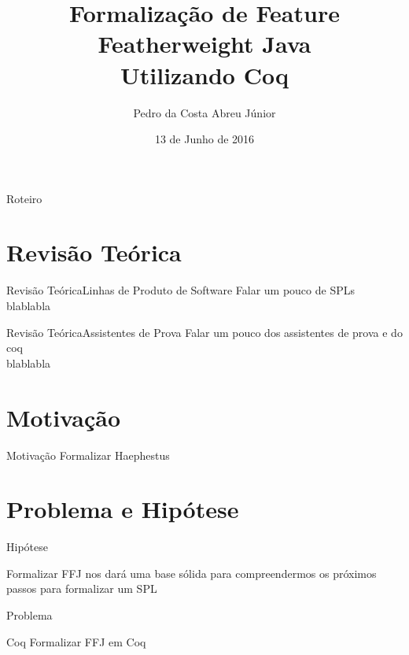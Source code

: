 \documentclass{beamer}
\title[Formalização de FFJ em Coq]{Formalização de Feature Featherweight Java \\ Utilizando Coq}
\author{Pedro da Costa Abreu Júnior}
\institute[UnB]
{
	Departamento de Ciência da Computação\\
	Universidade de Brasília 
}
\date{13 de Junho de 2016}
\begin{document}
	
	\begin{frame}
		\titlepage
	\end{frame}
	
	\begin{frame}{Roteiro}
		\tableofcontents
	\end{frame}
	
	\section{Revisão Teórica}
	\begin{frame}{Revisão Teórica}{Linhas de Produto de Software}
		\centering
		Falar um pouco de SPLs \\
		blablabla
	\end{frame}
	
	\begin{frame}{Revisão Teórica}{Assistentes de Prova}
		\centering
		Falar um pouco dos assistentes de prova e do coq \\
		blablabla
	\end{frame}

	\section{Motivação}
	\begin{frame}{Motivação}
			\centering
			Formalizar Haephestus
	\end{frame}
	
	\section{Problema e Hipótese}
	\begin{frame}{Hipótese}
		\begin{block}{}
			Formalizar FFJ nos dará uma base sólida para compreendermos os próximos passos para formalizar um SPL
		\end{block}
	\end{frame}
			
	\begin{frame}{Problema}
		\begin{block}{Coq}
			Formalizar FFJ em Coq
		\end{block}
	\end{frame}
	
\end{document}
